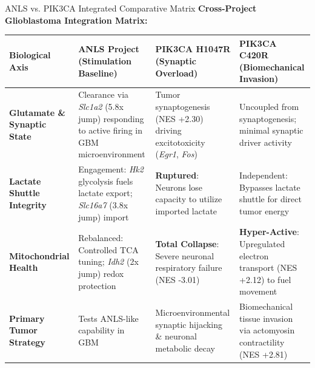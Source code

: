 \documentclass[10pt, aspectratio=169]{beamer}
\begin{document}
\begin{frame}{ANLS vs. PIK3CA Integrated Comparative Matrix}
  \centering
  {\small \textbf{Cross-Project Glioblastoma Integration Matrix:}}\par
  \vspace{0.15cm}
  \scriptsize
  \begin{tabular}{p{2.8cm} p{3.6cm} p{3.8cm} p{3.8cm}}
    \toprule
    \textbf{Biological Axis} & \textbf{ANLS Project (Stimulation Baseline)} & \textbf{PIK3CA H1047R (Synaptic Overload)} & \textbf{PIK3CA C420R (Biomechanical Invasion)} \\
    \midrule
    \textbf{Glutamate \& Synaptic State} & Clearance via \emph{Slc1a2} (5.8x jump) responding to active firing in GBM microenvironment & Tumor synaptogenesis (NES +2.30) driving excitotoxicity (\emph{Egr1}, \emph{Fos}) & Uncoupled from synaptogenesis; minimal synaptic driver activity \\
    \addlinespace
    \textbf{Lactate Shuttle Integrity} & Engagement: \emph{Hk2} glycolysis fuels lactate export; \emph{Slc16a7} (3.8x jump) import & \textbf{Ruptured}: Neurons lose capacity to utilize imported lactate & Independent: Bypasses lactate shuttle for direct tumor energy \\
    \addlinespace
    \textbf{Mitochondrial Health} & Rebalanced: Controlled TCA tuning; \emph{Idh2} (2x jump) redox protection & \textbf{Total Collapse}: Severe neuronal respiratory failure (NES -3.01) & \textbf{Hyper-Active}: Upregulated electron transport (NES +2.12) to fuel movement \\
    \addlinespace
    \textbf{Primary Tumor Strategy} & Tests ANLS-like capability in GBM & Microenvironmental synaptic hijacking \& neuronal metabolic decay & Biomechanical tissue invasion via actomyosin contractility (NES +2.81) \\
    \bottomrule
  \end{tabular}
\end{frame}
\end{document}
